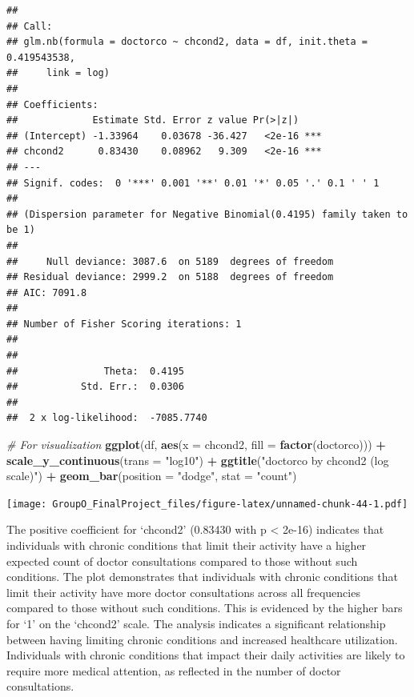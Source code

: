 \documentclass[
]{article}
\newenvironment{Shaded}{\begin{snugshade}}{\end{snugshade}}
\newcommand{\AttributeTok}[1]{\textcolor[rgb]{0.13,0.29,0.53}{#1}}
\newcommand{\CommentTok}[1]{\textcolor[rgb]{0.56,0.35,0.01}{\textit{#1}}}
\newcommand{\FunctionTok}[1]{\textcolor[rgb]{0.13,0.29,0.53}{\textbf{#1}}}
\newcommand{\NormalTok}[1]{#1}
\newcommand{\SpecialCharTok}[1]{\textcolor[rgb]{0.81,0.36,0.00}{\textbf{#1}}}
\newcommand{\StringTok}[1]{\textcolor[rgb]{0.31,0.60,0.02}{#1}}
\begin{document}
\begin{verbatim}
## 
## Call:
## glm.nb(formula = doctorco ~ chcond2, data = df, init.theta = 0.419543538, 
##     link = log)
## 
## Coefficients:
##             Estimate Std. Error z value Pr(>|z|)    
## (Intercept) -1.33964    0.03678 -36.427   <2e-16 ***
## chcond2      0.83430    0.08962   9.309   <2e-16 ***
## ---
## Signif. codes:  0 '***' 0.001 '**' 0.01 '*' 0.05 '.' 0.1 ' ' 1
## 
## (Dispersion parameter for Negative Binomial(0.4195) family taken to be 1)
## 
##     Null deviance: 3087.6  on 5189  degrees of freedom
## Residual deviance: 2999.2  on 5188  degrees of freedom
## AIC: 7091.8
## 
## Number of Fisher Scoring iterations: 1
## 
## 
##               Theta:  0.4195 
##           Std. Err.:  0.0306 
## 
##  2 x log-likelihood:  -7085.7740
\end{verbatim}

\begin{Shaded}
\begin{Highlighting}[]
\CommentTok{\# For visualization}
\FunctionTok{ggplot}\NormalTok{(df, }\FunctionTok{aes}\NormalTok{(}\AttributeTok{x =}\NormalTok{ chcond2, }\AttributeTok{fill =} \FunctionTok{factor}\NormalTok{(doctorco))) }\SpecialCharTok{+} 
  \FunctionTok{scale\_y\_continuous}\NormalTok{(}\AttributeTok{trans =} \StringTok{"log10"}\NormalTok{) }\SpecialCharTok{+}
  \FunctionTok{ggtitle}\NormalTok{(}\StringTok{"\textquotesingle{}doctorco\textquotesingle{} by \textquotesingle{}chcond2\textquotesingle{} (log scale)"}\NormalTok{) }\SpecialCharTok{+}
  \FunctionTok{geom\_bar}\NormalTok{(}\AttributeTok{position =} \StringTok{"dodge"}\NormalTok{, }\AttributeTok{stat =} \StringTok{"count"}\NormalTok{)}
\end{Highlighting}
\end{Shaded}

\texttt{[image: GroupO\_FinalProject\_files/figure-latex/unnamed-chunk-44-1.pdf]}

The positive coefficient for `chcond2' (0.83430 with p \textless{}
2e-16) indicates that individuals with chronic conditions that limit
their activity have a higher expected count of doctor consultations
compared to those without such conditions. The plot demonstrates that
individuals with chronic conditions that limit their activity have more
doctor consultations across all frequencies compared to those without
such conditions. This is evidenced by the higher bars for `1' on the
`chcond2' scale. The analysis indicates a significant relationship
between having limiting chronic conditions and increased healthcare
utilization. Individuals with chronic conditions that impact their daily
activities are likely to require more medical attention, as reflected in
the number of doctor consultations.
\end{document}
